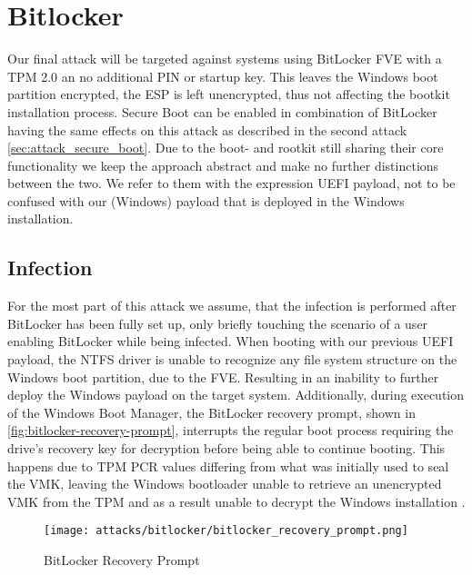 \section{Bitlocker}

Our final attack will be targeted against systems using BitLocker \ac{FVE} with a \ac{TPM} 2.0 an no additional PIN or startup key. This leaves the Windows boot partition encrypted, the \ac{ESP} is left unencrypted, thus not affecting the bootkit installation process. Secure Boot can be enabled in combination of BitLocker having the same effects on this attack as described in the second attack \autoref{sec:attack_secure_boot}. Due to the boot- and rootkit still sharing their core functionality we keep the approach abstract and make no further distinctions between the two. We refer to them with the expression \ac{UEFI} payload, not to be confused with our (Windows) payload that is deployed in the Windows installation.

\subsection{Infection}

For the most part of this attack we assume, that the infection is performed after BitLocker has been fully set up, only briefly touching the scenario of a user enabling BitLocker while being infected. When booting with our previous \ac{UEFI} payload, the \ac{NTFS} driver is unable to recognize any file system structure  on the Windows boot partition, due to the \ac{FVE}. Resulting in an inability to further deploy the Windows payload on the target system. Additionally, during execution of the Windows Boot Manager, the BitLocker recovery prompt, shown in \autoref{fig:bitlocker-recovery-prompt}, interrupts the regular boot process requiring the drive's recovery key for decryption before being able to continue booting.
This happens due to \ac{TPM} \ac{PCR} values differing from what was initially used to seal the \ac{VMK}, leaving the Windows bootloader unable to retrieve an unencrypted \ac{VMK} from the \ac{TPM} and as a result unable to decrypt the Windows installation \cite[12.]{windows-internals-7-part2}.

\begin{figure}[htb]
    \centering
    \texttt{[image: attacks/bitlocker/bitlocker\_recovery\_prompt.png]}
    \caption{BitLocker Recovery Prompt}
    \label{fig:bitlocker-recovery-prompt}
\end{figure}

